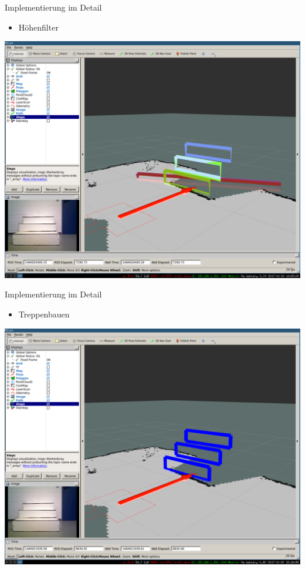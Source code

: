 \documentclass[18pt]{beamer}
\begin{document}
\begin{frame}{Implementierung im Detail}
\begin{itemize}
	\item Höhenfilter
\end{itemize}
\begin{center}
	\includegraphics[scale=0.16]{images/ransac02.pdf}
\end{center}
\end{frame}

\begin{frame}{Implementierung im Detail}
\begin{itemize}
	\item Treppenbauen
\end{itemize}
\begin{center}
	\includegraphics[scale=0.16]{images/ransac03.pdf}
\end{center}
\end{frame}
\end{document}

